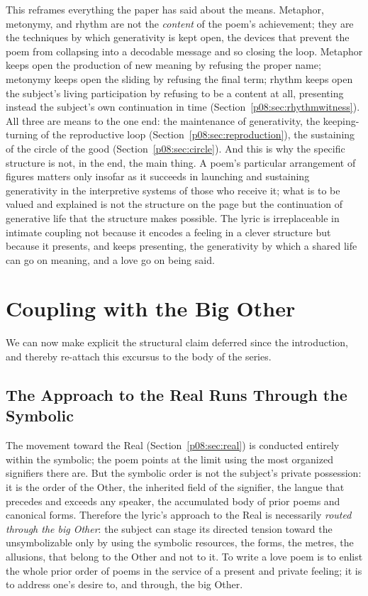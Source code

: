 This reframes everything the paper has said about the means. Metaphor, metonymy, and rhythm are not the \emph{content} of the poem's achievement; they are the techniques by which generativity is kept open, the devices that prevent the poem from collapsing into a decodable message and so closing the loop. Metaphor keeps open the production of new meaning by refusing the proper name; metonymy keeps open the sliding by refusing the final term; rhythm keeps open the subject's living participation by refusing to be a content at all, presenting instead the subject's own continuation in time (Section~\ref{p08:sec:rhythmwitness}). All three are means to the one end: the maintenance of generativity, the keeping-turning of the reproductive loop (Section~\ref{p08:sec:reproduction}), the sustaining of the circle of the good (Section~\ref{p08:sec:circle}). And this is why the specific structure is not, in the end, the main thing. A poem's particular arrangement of figures matters only insofar as it succeeds in launching and sustaining generativity in the interpretive systems of those who receive it; what is to be valued and explained is not the structure on the page but the continuation of generative life that the structure makes possible. The lyric is irreplaceable in intimate coupling not because it encodes a feeling in a clever structure but because it presents, and keeps presenting, the generativity by which a shared life can go on meaning, and a love go on being said.

\section{Coupling with the Big Other}\label{p08:sec:bigother}

We can now make explicit the structural claim deferred since the introduction, and thereby re-attach this excursus to the body of the series.

\subsection{The Approach to the Real Runs Through the Symbolic}

The movement toward the Real (Section~\ref{p08:sec:real}) is conducted entirely within the symbolic; the poem points at the limit using the most organized signifiers there are. But the symbolic order is not the subject's private possession: it is the order of the Other, the inherited field of the signifier, the langue that precedes and exceeds any speaker, the accumulated body of prior poems and canonical forms. Therefore the lyric's approach to the Real is necessarily \emph{routed through the big Other}: the subject can stage its directed tension toward the unsymbolizable only by using the symbolic resources, the forms, the metres, the allusions, that belong to the Other and not to it. To write a love poem is to enlist the whole prior order of poems in the service of a present and private feeling; it is to address one's desire to, and through, the big Other.

